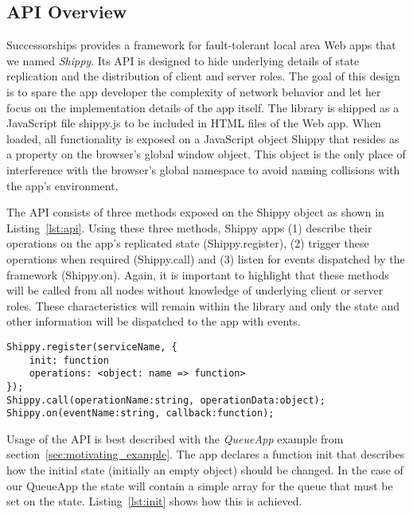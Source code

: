 \subsection{API Overview}
\label{sub:approach_api_overview}

Successorships provides a framework for fault-tolerant local area Web apps that we named \textit{Shippy}.
Its API is designed to hide underlying details of state replication and the distribution of client and server roles.
The goal of this design is to spare the app developer the complexity of network behavior and let her focus on the implementation details of the app itself.
The library is shipped as a JavaScript file {\ttfamily shippy.js} to be included in HTML files of the Web app.
When loaded, all functionality is exposed on a JavaScript object {\ttfamily Shippy} that resides as a property on the browser's global {\ttfamily window} object.
This object is the only place of interference with the browser's global namespace to avoid naming collisions with the app's environment.

The API consists of three methods exposed on the {\ttfamily Shippy} object as shown in Listing~\ref{lst:api}.
Using these three methods, Shippy apps (1) describe their operations on the app's replicated state ({\ttfamily Shippy.register}), (2) trigger these operations when required ({\ttfamily Shippy.call}) and (3) listen for events dispatched by the framework ({\ttfamily Shippy.on}).
Again, it is important to highlight that these methods will be called from all nodes without knowledge of underlying client or server roles.
These characteristics will remain within the library and only the state and other information will be dispatched to the app with events.

\begin{lstlisting}[caption={Successorships API},label={lst:api}]
Shippy.register(serviceName, {
    init: function
    operations: <object: name => function>
});
Shippy.call(operationName:string, operationData:object);
Shippy.on(eventName:string, callback:function);
\end{lstlisting}

Usage of the API is best described with the \textit{QueueApp} example from section~\ref{sec:motivating_example}.
The app declares a function {\ttfamily init} that describes how the initial state (initially an empty object) should be changed.
In the case of our QueueApp the state will contain a simple array for the queue that must be set on the state.
Listing~\ref{lst:init} shows how this is achieved.

